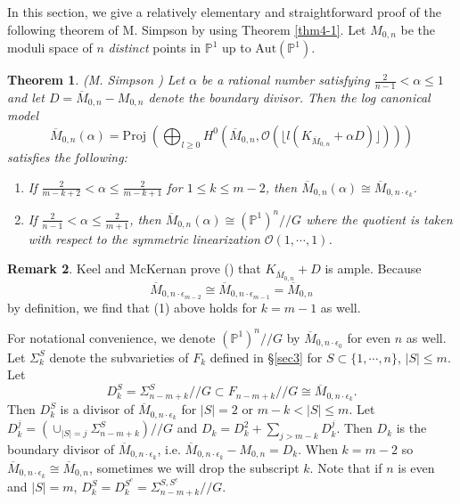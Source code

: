 \documentclass[10pt]{amsart}
\newtheorem{theorem}{Theorem}[section]
\theoremstyle{definition}
\newtheorem{remark}[theorem]{Remark}
\newcommand{\PP}{\mathbb{P}}
\newcommand{\cO}{\mathcal{O} }
\newcommand{\proj}{\mathrm{Proj}\;}
\def\Mzn{\overline{M}_{0,n} }
\def\Mzez{\overline{M}_{0,n\cdot \epsilon_0} }
\def\Mzemt{\overline{M}_{0,n\cdot \epsilon_{m-2}} }
\def\Mzemo{\overline{M}_{0,n\cdot \epsilon_{m-1}} }
\def\Mzek{\overline{M}_{0,n\cdot \epsilon_k} }
\def\git{/\!/ }
\begin{document}
In this section, we give a relatively elementary and
straightforward proof of the following theorem of M. Simpson by
using Theorem \ref{thm4-1}. Let $M_{0,n}$ be the moduli space of
$n$ \emph{distinct} points in $\PP^1$ up to $\mathrm{Aut}(\PP^1)$.

\begin{theorem} \label{thm6.1}\emph{(M. Simpson \cite{Simpson})}
Let $\alpha$ be a rational number satisfying $\frac{2}{n-1} <
\alpha \le 1$ and let $D=\Mzn-M_{0,n}$ denote the boundary
divisor. Then the log canonical model
\[
    \Mzn(\alpha) =
    \proj\left(\bigoplus_{l \ge 0} H^0(\Mzn, \cO(\lfloor l (K_{\Mzn}
    +\alpha D) \rfloor))\right)
\]
satisfies the following:
\begin{enumerate}
\item If $\frac{2}{m-k+2} < \alpha \le \frac{2}{m-k+1}$ for $1\le k\le
m-2$, then $\Mzn(\alpha) \cong \Mzek$.\item  If $\frac{2}{n-1} <
\alpha \le \frac{2}{m+1}$, then $\Mzn(\alpha) \cong (\PP^1)^n \git
G$ where the quotient is taken with respect to the symmetric
linearization $\cO(1,\cdots,1)$.
\end{enumerate}
\end{theorem}
\begin{remark} Keel and McKernan prove (\cite[Lemma 3.6]{KeelMcKer}) that
$K_{\Mzn} + D$ is ample. Because $$\Mzemt\cong\Mzemo= \Mzn$$ by
definition, we find that (1) above holds for $k=m-1$ as
well.\end{remark}

For notational convenience, we denote $(\PP^1)^n\git G$ by $\Mzez$
for even $n$ as well. Let $\Sigma_k^S$ denote the subvarieties of
$F_k$ defined in \S\ref{sec3} for $S\subset \{1,\cdots,n\}$,
$|S|\le m$. Let
$$D_k^S=\Sigma_{n-m+k}^S\git G\subset F_{n-m+k}\git G\cong \Mzek.$$
Then $D_k^S$ is a divisor of $\Mzek$ for $|S|=2$ or $m-k<|S|\le
m$. Let $D_k^j=(\cup_{|S|=j}\Sigma_{n-m+k}^S)\git G$ and
$D_k=D_k^2+\sum_{j>m-k}D^j_k$. Then $D_k$ is the boundary divisor
of $\Mzek$, i.e. $\Mzek-M_{0,n}=D_k$. When $k = m-2$ so $\Mzek \cong
\Mzn$, sometimes we will drop the subscript $k$. Note that if $n$ is even and
$|S|=m$, $D_k^S=D_k^{S^c}=\Sigma^{S,S^c}_{n-m+k}\git G$.
\end{document}
